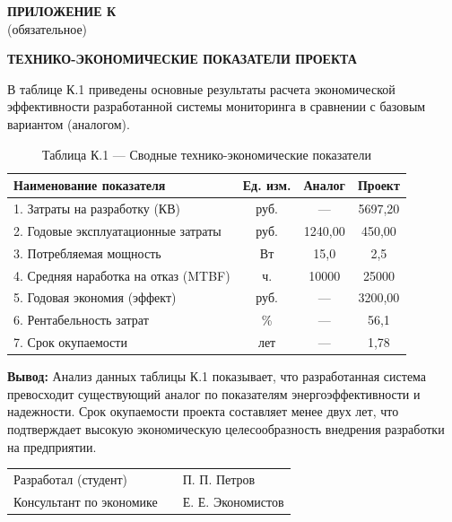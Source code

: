 \newpage
\begin{flushright}
    {\bfseries ПРИЛОЖЕНИЕ К} \\
    (обязательное)
\end{flushright}

\begin{center}
    {\bfseries ТЕХНИКО-ЭКОНОМИЧЕСКИЕ ПОКАЗАТЕЛИ ПРОЕКТА}
\end{center}


\vspace{0.5cm}

\noindent В таблице К.1 приведены основные результаты расчета экономической эффективности разработанной системы мониторинга в сравнении с базовым вариантом (аналогом).

\vspace{0.3cm}

\begin{table}[h!]
    \centering
    \caption*{Таблица К.1 --- Сводные технико-экономические показатели}
    \begin{tabular}{|p{7cm}|c|c|c|}
        \hline
        \centering \textbf{Наименование показателя} & \textbf{Ед. изм.} & \textbf{Аналог} & \textbf{Проект} \\ \hline
        1. Затраты на разработку (КВ) & руб. & --- & 5697,20 \\ \hline
        2. Годовые эксплуатационные затраты & руб. & 1240,00 & 450,00 \\ \hline
        3. Потребляемая мощность & Вт & 15,0 & 2,5 \\ \hline
        4. Средняя наработка на отказ (MTBF) & ч. & 10000 & 25000 \\ \hline
        5. Годовая экономия (эффект) & руб. & --- & 3200,00 \\ \hline
        6. Рентабельность затрат & \% & --- & 56,1 \\ \hline
        7. Срок окупаемости & лет & --- & 1,78 \\ \hline
    \end{tabular}
\end{table}

\vspace{1cm}

\noindent \textbf{Вывод:} Анализ данных таблицы К.1 показывает, что разработанная система превосходит существующий аналог по показателям энергоэффективности и надежности. Срок окупаемости проекта составляет менее двух лет, что подтверждает высокую экономическую целесообразность внедрения разработки на предприятии.

\vfill

\begin{flushleft}
    \begin{tabular}{p{6cm} p{4cm} l}
        Разработал (студент) & \underline{\hspace{3cm}} & П. П. Петров \\
        Консультант по экономике & \underline{\hspace{3cm}} & Е. Е. Экономистов
    \end{tabular}
\end{flushleft}

\newpage